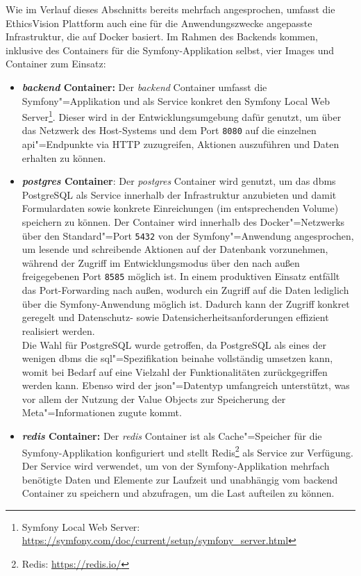 \documentclass[a4paper,12pt,twoside]{scrreprt}
\begin{document}
Wie im Verlauf dieses Abschnitts bereits mehrfach angesprochen, umfasst die EthicsVision Plattform auch eine für die Anwendungszwecke angepasste Infrastruktur, die auf Docker basiert. Im Rahmen des Backends kommen, inklusive des Containers für die Symfony-Applikation selbst, vier Images und Container zum Einsatz:
\begin{itemize}
    \item \textbf{\textit{backend} Container:} Der \textit{backend} Container umfasst die Symfony"=Applikation und als Service konkret den Symfony Local Web Server\footnote{Symfony Local Web Server: \url{https://symfony.com/doc/current/setup/symfony_server.html}}. Dieser wird in der Entwicklungsumgebung dafür genutzt, um über das Netzwerk des Host-Systems und dem Port \texttt{8080} auf die einzelnen \ac{api}"=Endpunkte via HTTP zuzugreifen, Aktionen auszuführen und Daten erhalten zu können.
    \item \textbf{\textit{postgres} Container}: Der \textit{postgres} Container wird genutzt, um das \acl{dbms} PostgreSQL als Service innerhalb der Infrastruktur anzubieten und damit Formulardaten sowie konkrete Einreichungen (im entsprechenden Volume) speichern zu können. Der Container wird innerhalb des Docker"=Netzwerks über den Standard"=Port \texttt{5432} von der Symfony"=Anwendung angesprochen, um lesende und schreibende Aktionen auf der Datenbank vorzunehmen, während der Zugriff im Entwicklungsmodus über den nach außen freigegebenen Port \texttt{8585} möglich ist. In einem produktiven Einsatz entfällt das Port-Forwarding nach außen, wodurch ein Zugriff auf die Daten lediglich über die Symfony-Anwendung möglich ist. Dadurch kann der Zugriff konkret geregelt und Datenschutz- sowie Datensicherheitsanforderungen effizient realisiert werden.\\
    Die Wahl für PostgreSQL wurde getroffen, da PostgreSQL als eines der wenigen \ac{dbms} die \ac{sql}"=Spezifikation beinahe vollständig umsetzen kann, womit bei Bedarf auf eine Vielzahl der Funktionalitäten zurückgegriffen werden kann. Ebenso wird der \ac{json}"=Datentyp umfangreich unterstützt, was vor allem der Nutzung der Value Objects zur Speicherung der Meta"=Informationen zugute kommt. \cite{brumm_why_2019}
    \item \textbf{\textit{redis} Container:} Der \textit{redis} Container ist als Cache"=Speicher für die Symfony-Applikation konfiguriert und stellt Redis\footnote{Redis: \url{https://redis.io/}} als Service zur Verfügung. Der Service wird verwendet, um von der Symfony-Applikation mehrfach benötigte Daten und Elemente zur Laufzeit und unabhängig vom backend Container zu speichern und abzufragen, um die Last aufteilen zu können. 

\end{itemize}
\end{document}
